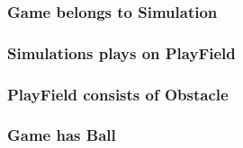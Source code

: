 \documentclass[fontsize=12pt,
               paper=a4,
               twoside=false,
               parskip=half,
               ]{scrartcl}
\begin{document}
\subsubsection{Game belongs to Simulation}

\subsubsection{Simulations plays on PlayField}

\subsubsection{PlayField consists of Obstacle}

\subsubsection{Game has Ball}


\end{document}
